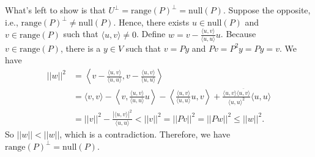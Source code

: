 What's left to show is that $U^{\perp} = \mathrm{range}(P)^{\perp} = \mathrm{null}(P)$.
Suppose the opposite, i.e., $\mathrm{range}(P)^{\perp} \neq \mathrm{null}(P)$.
Hence, there exists $u \in \mathrm{null}(P)$ and $v \in \mathrm{range}(P)$ such that $\langle u, v \rangle \neq 0$.
Define $w = v - \frac{\langle u, v \rangle}{\langle u, u \rangle} u$.
Because $v \in \mathrm{range}(P)$, there is a $y \in V$ such that $v = Py$ and $Pv = P^2y = Py = v$.
We have
\begin{equation*}
    \begin{split}
        ||w||^2 &= \left\langle
                v - \frac{\langle u, v \rangle}{\langle u, u \rangle},
                v - \frac{\langle u, v \rangle}{\langle u, u \rangle}
            \right\rangle \\
            &= \langle v, v \rangle
                - \left\langle v, \frac{\langle u, v \rangle}{\langle u, u \rangle} u \right\rangle
                - \left\langle \frac{\langle u, v \rangle}{\langle u, u \rangle} u, v \right\rangle
                + \frac{\langle u, v \rangle \overline{\langle u, v \rangle}}{\langle u, u \rangle^2} \langle u, u \rangle \\
            &= ||v||^2 - \frac{|\langle u, v \rangle|^2}{\langle u, u \rangle} < ||v||^2 = ||Pv||^2 = ||Pw||^2 \leq ||w||^2.
    \end{split}
\end{equation*}
So $||w|| < ||w||$, which is a contradiction.
Therefore, we have $\mathrm{range}(P)^{\perp} = \mathrm{null}(P)$.
